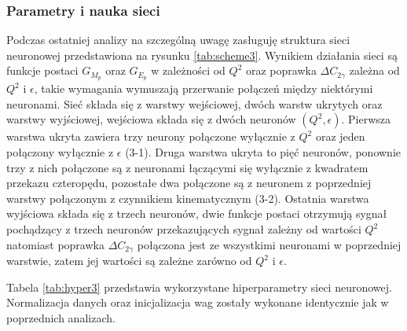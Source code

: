 \documentclass[11pt]{book}
\theoremstyle{definition}
\begin{document}
\subsubsection{Parametry i nauka sieci}
Podczas ostatniej analizy na szczególną uwagę zasługuję struktura sieci neuronowej przedstawiona na rysunku \ref{tab:scheme3}. Wynikiem działania sieci są funkcje postaci $G_{M_p}$ oraz $G_{E_p}$ w zależności od $Q^2$ oraz poprawka $\Delta C_{2\gamma}$ zależna od $Q^2$ i $\epsilon$, takie wymagania wymuszają przerwanie połączeń między niektórymi neuronami. Sieć składa się z warstwy wejściowej, dwóch warstw ukrytych oraz warstwy wyjściowej, wejściowa składa się z dwóch neuronów $(Q^2, \epsilon)$. Pierwsza warstwa ukryta zawiera trzy neurony połączone wyłącznie z $Q^2$ oraz jeden połączony wyłącznie z $\epsilon$ (3-1). Druga warstwa ukryta to pięć neuronów, ponownie trzy z nich połączone są z neuronami łączącymi się wyłącznie z kwadratem przekazu czteropędu, pozostałe dwa połączone są z neuronem z poprzedniej warstwy połączonym z czynnikiem kinematycznym (3-2). Ostatnia warstwa wyjściowa składa się z trzech neuronów, dwie funkcje postaci otrzymują sygnał pochądzący z trzech neuronów przekazujących sygnał zależny od wartości $Q^2$ natomiast poprawka $\Delta C_{2\gamma}$ połączona jest ze wszystkimi neuronami w poprzedniej warstwie, zatem jej wartości są zależne zarówno od $Q^2$ i $\epsilon$. 

Tabela \ref{tab:hyper3} przedstawia wykorzystane hiperparametry sieci neuronowej. Normalizacja danych oraz inicjalizacja wag zostały wykonane identycznie jak w poprzednich analizach.
\end{document}
